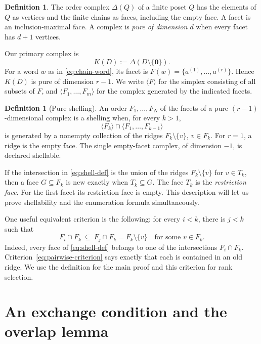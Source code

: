 \documentclass[11pt]{article}
\numberwithin{equation}{section}
\theoremstyle{definition}
\newtheorem{definition}[theorem]{Definition}
\theoremstyle{remark}
\newcommand{\zero}{\mathbf 0}
\newcommand{\pow}[1]{\langle #1\rangle}
\begin{document}
\begin{definition}
The order complex $\Delta(Q)$ of a finite poset $Q$ has the elements of $Q$
as vertices and the finite chains as faces, including the empty face. A facet
is an inclusion-maximal face. A complex is \emph{pure of dimension $d$} when
every facet has $d+1$ vertices.
\end{definition}

Our primary complex is
\[
 K(D):=\Delta(D\setminus\{\zero\}).
\]
For a word $w$ as in \eqref{eq:chain-word}, its facet is
$F(w)=\{a^{(1)},\ldots,a^{(r)}\}$. Hence $K(D)$ is pure of dimension $r-1$.
We write $\pow{F}$ for the simplex consisting of all subsets of $F$, and
$\pow{F_1,\ldots,F_m}$ for the complex generated by the indicated facets.

\begin{definition}[Pure shelling]
An order $F_1,\ldots,F_N$ of the facets of a pure $(r-1)$-dimensional complex
is a shelling when, for every $k>1$,
\begin{equation}
 \pow{F_k}\cap\pow{F_1,\ldots,F_{k-1}}
 \label{eq:shell-def}
\end{equation}
is generated by a nonempty collection of the ridges $F_k\setminus\{v\}$,
$v\in F_k$. For $r=1$, a ridge is the empty face. The single empty-facet
complex, of dimension $-1$, is declared shellable.
\end{definition}

If the intersection in \eqref{eq:shell-def} is the union of the ridges
$F_k\setminus\{v\}$ for $v\in T_k$, then a face $G\subseteq F_k$ is new
exactly when $T_k\subseteq G$. The face $T_k$ is the \emph{restriction face}.
For the first facet its restriction face is empty. This description will let
us prove shellability and the enumeration formula simultaneously.

One useful equivalent criterion is the following: for every $i<k$, there is
$j<k$ such that
\begin{equation}
 F_i\cap F_k\ \subseteq\ F_j\cap F_k
       =F_k\setminus\{v\}
 \quad\text{for some }v\in F_k.
 \label{eq:pairwise-criterion}
\end{equation}
Indeed, every face of \eqref{eq:shell-def} belongs to one of the intersections
$F_i\cap F_k$. Criterion~\eqref{eq:pairwise-criterion} says exactly that each
is contained in an old ridge. We use the definition for the main proof and
this criterion for rank selection.

\section{An exchange condition and the overlap lemma}
\label{sec:exchange}
\end{document}
